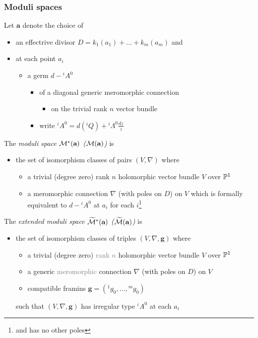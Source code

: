 \subsubsection{Moduli spaces} %
Let  $\textbf{a}$ denote the choice of
\begin{itemize}
  \item an effectrive divisor $D=k_1(a_1)+\dots+k_m(a_m)$ and
  \item at each point $a_i$
    \begin{itemize}
      \item a germ $d-{}^iA^0$
        \begin{itemize}
          \item of a diagonal generic meromorphic connection
            \begin{itemize}
              \item on the trivial rank $n$ vector bundle
            \end{itemize}
          \item write ${}^iA^0=d({}^iQ)+{}^i\Lambda^0\frac{dz}{z}$
        \end{itemize}
    \end{itemize}
\end{itemize}
\begin{defn}[2.5]
  The \emph{moduli space $\cM^*(\textbf{a})$
  \textcolor{green!40!black}{($\cM(\textbf{a})$)}} is
  \begin{itemize}
    \item the set of isomorphism classes of pairs $(V,\nabla)$ where
      \begin{itemize}
        \item a trivial \textcolor{green!40!black}{(degree zero)} rank $n$
          holomorphic vector bundle $V$ over $\P^1$
        \item a meromorphic connection $\nabla$ (with poles on $D$) on $V$
          which is formally equivalent to $d-{}^iA^0$ at $a_i$ for each
          $i$\footnote{and has no other poles}
      \end{itemize}
  \end{itemize}
\end{defn}
\begin{defn}[2.6]
  The \emph{extended moduli space $\widetilde\cM^*(\textbf{a})$
  \textcolor{green!40!black}{($\widetilde\cM(\textbf{a})$)}} is
  \begin{itemize}
    \item the set of isomorphism classes of triples $(V,\nabla,\textbf{g})$
      where
      \begin{itemize}
        \item a trivial \textcolor{green!40!black}{(degree zero)}
          \textcolor{gray}{rank $n$} holomorphic vector bundle $V$ over $\P^1$
        \item a generic \textcolor{gray}{meromorphic} connection $\nabla$
          (with poles on $D$) on $V$
        \item compatible framins $\textbf{g}=({}^1g_0,\dots,{}^mg_0)$
      \end{itemize}
      such that $(V,\nabla,\textbf{g})$ has irregular type ${}^iA^0$ at each
      $a_i$
  \end{itemize}
\end{defn}

